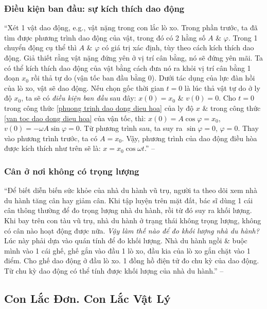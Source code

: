 \documentclass{article}
\numberwithin{equation}{section}
\begin{document}
\subsubsection{Điều kiện ban đầu: sự kích thích dao động}
``Xét 1 vật dao động, e.g., vật nặng trong con lắc lò xo. Trong phần trước, ta đã tìm được phương trình dao động của vật, trong đó có 2 hằng số $A$ \& $\varphi$. Trong 1 chuyển động cụ thể thì $A$ \& $\varphi$ có giá trị xác định, tùy theo cách kích thích dao động. Giả thiết rằng vật nặng đứng yên ở vị trí cân bằng, nó sẽ đứng yên mãi. Ta có thể kích thích dao động của vật bằng cách đưa nó ra khỏi vị trí cân bằng 1 đoạn $x_0$ rồi thả tự do (vận tốc ban đầu bằng $0$). Dưới tác dụng của lực đàn hồi của lò xo, vật sẽ dao động. Nếu chọn gốc thời gian $t = 0$ là lúc thả vật tự do ở ly độ $x_0$, ta sẽ có \textit{điều kiện ban đầu} sau đây: $x(0) = x_0$ \& $v(0) = 0$. Cho $t = 0$ trong công thức \eqref{phuong trinh dao dong dieu hoa} của ly độ $x$ \& trong công thức \eqref{van toc dao dong dieu hoa} của vận tốc, thì: $x(0) = A\cos\varphi = x_0$, $v(0) = -\omega A\sin\varphi = 0$. Từ phương trình sau, ta suy ra $\sin\varphi = 0$, $\varphi = 0$. Thay vào phương trình trước, ta có $A = x_0$. Vậy, phương trình của dao động điều hòa được kích thích như trên sẽ là: $x = x_0\cos\omega t$.'' -- \cite[pp. 33--34]{SGK_Vat_Ly_12_nang_cao}

\subsubsection{Cân ở nơi không có trọng lượng}
``Để biết diễn biến sức khỏe của nhà du hành vũ trụ, người ta theo dõi xem nhà du hành tăng cân hay giảm cân. Khi tập luyện trên mặt đất, bác sĩ dùng 1 cái cân thông thường để đo trọng lượng nhà du hành, rồi từ đó suy ra khối lượng. Khi bay trên con tàu vũ trụ, nhà du hành ở trạng thái không trọng lượng, không có cân nào hoạt động được nữa. \textit{Vậy làm thế nào để đo khối lượng nhà du hành?} Lúc này phải dựa vào quán tính để đo khối lượng. Nhà du hành ngồi \& buộc mình vào 1 cái ghế, ghế gắn vào đầu 1 lò xo, đầu kia của lò xo gắn chặt vào 1 điểm. Cho ghế dao động ở đầu lò xo. 1 đồng hồ điện tử đo chu kỳ của dao động. Từ chu kỳ dao động có thể tính được khối lượng của nhà du hành.'' -- \cite[p. 35]{SGK_Vat_Ly_12_nang_cao}


\subsection{Con Lắc Đơn. Con Lắc Vật Lý}
\end{document}
